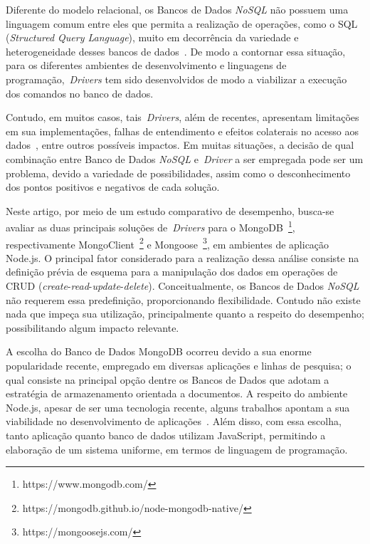 \documentclass[12pt]{article}
\begin{document}

Diferente do modelo relacional, os Bancos de Dados \textit{NoSQL} não possuem uma linguagem comum entre eles que permita a realização de operações, como o SQL (\emph{Structured Query Language}), muito em decorrência da variedade e heterogeneidade desses bancos de dados~\cite{bugiotti2013object,sellami2014odbapi}. 
De modo a contornar essa situação, para os diferentes ambientes de desenvolvimento e linguagens de programação,~\emph{Drivers} tem sido desenvolvidos de modo a viabilizar a execução dos comandos no banco de dados. 

Contudo, em muitos casos, tais~\emph{Drivers}, além de recentes, apresentam limitações em sua implementações, falhas de entendimento e efeitos colaterais no acesso aos dados~\cite{rafique2018performance}, entre outros possíveis impactos.
Em muitas situações, a decisão de qual combinação entre Banco de Dados \textit{NoSQL} e~\emph{Driver} a ser empregada pode ser um problema, devido a variedade de possibilidades, assim como o desconhecimento dos pontos positivos e negativos de cada solução. %

Neste artigo, por meio de um estudo comparativo de desempenho, busca-se avaliar as duas principais soluções de~\emph{Drivers} para o MongoDB~\footnote{https://www.mongodb.com/}, respectivamente MongoClient~\footnote{https://mongodb.github.io/node-mongodb-native/} e Mongoose~\footnote{https://mongoosejs.com/}, em ambientes de aplicação Node.js. O principal fator considerado para a realização dessa análise consiste na definição prévia de esquema para a manipulação dos dados em operações de CRUD (\emph{create}-\emph{read}-\emph{update}-\emph{delete}). Conceitualmente, os Bancos de Dados \textit{NoSQL} não requerem essa predefinição, proporcionando flexibilidade. Contudo não existe nada que impeça sua utilização, principalmente quanto a respeito do desempenho; possibilitando algum impacto relevante.%

A escolha do Banco de Dados MongoDB ocorreu devido a sua enorme popularidade recente, empregado em diversas aplicações e linhas de pesquisa; o qual consiste na principal opção dentre os Bancos de Dados que adotam a estratégia de armazenamento orientada a documentos. %
A respeito do ambiente Node.js, apesar de ser uma tecnologia recente, alguns trabalhos apontam a sua viabilidade no desenvolvimento de aplicações~\cite{chaniotis2015node}. Além disso, com essa escolha, tanto aplicação quanto banco de dados utilizam JavaScript, permitindo a elaboração de um sistema uniforme, em termos de linguagem de programação.
\end{document}
